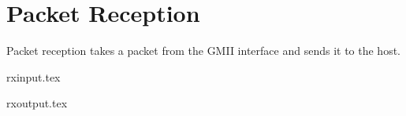 \section{Packet Reception}
Packet reception takes a packet from the GMII interface and sends it
to the host.

{rxinput.tex}

{rxoutput.tex}



